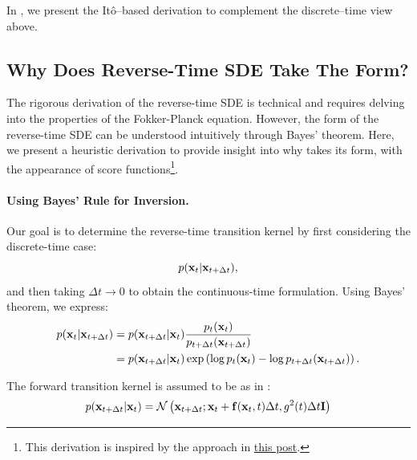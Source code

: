 In , we present the It\^o--based derivation to complement the discrete--time view above.




\subsection{Why Does Reverse-Time SDE Take The Form?}\label{subsec:reverse-sde-reason}

The rigorous derivation of the reverse-time SDE is technical and requires delving into the properties of the Fokker-Planck equation. However, the form of the reverse-time SDE can be understood intuitively through Bayes' theorem. Here, we present a heuristic derivation to provide insight into why  takes its form, with the appearance of score functions\footnote{This derivation is inspired by the approach in \href{https://alexxthiery.github.io/notes/reverse_and_tweedie/reverse_and_tweedie.html}{this post}.}. 


\paragraph{Using Bayes' Rule for Inversion.} 
Our goal is to determine the reverse-time transition kernel by first considering the discrete-time case:
\[
p({\mathbf{x}}_t | {\mathbf{x}}_{t+\Delta t}),
\]
and then taking $\Delta t \rightarrow 0$ to obtain the continuous-time formulation.
Using Bayes' theorem, we express:
\begin{align}\label{eq:reverse-sde-bayes-discrete}
    p({\mathbf{x}}_t | {\mathbf{x}}_{t+\Delta t}) 
    &= p({\mathbf{x}}_{t+\Delta t} | {\mathbf{x}}_t) \frac{p_t({\mathbf{x}}_t)}{p_{t+\Delta t}({\mathbf{x}}_{t+\Delta t})} \nonumber \\
    &= p({\mathbf{x}}_{t+\Delta t} | {\mathbf{x}}_t) \exp\left(\log p_t({\mathbf{x}}_t) - \log p_{t+\Delta t}({\mathbf{x}}_{t+\Delta t})\right).
\end{align}

The forward transition kernel is assumed to be as in :
\begin{equation*}
p({\mathbf{x}}_{t+\Delta t} | {\mathbf{x}}_t) = \mathcal{N}\left({\mathbf{x}}_{t+\Delta t}; {\mathbf{x}}_t + {\mathbf{f}}({\mathbf{x}}_t, t)\Delta t, g^2(t)\Delta t \mathbf{I}\right)
\end{equation*}

